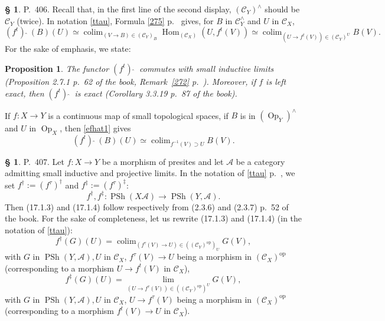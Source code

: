 \documentclass[12pt]{article}
\newtheorem{prop}[thm]{Proposition}
\theoremstyle{remark}
\theoremstyle{definition}
\newtheorem{s}[thm]{\S}
\newcommand{\oo}{\operatorname}
\newcommand{\A}{\mathcal A}
\newcommand{\C}{\mathcal C}
\newcommand{\fthat}{(f^t)\ \widehat{}\ }
\DeclareMathOperator*{\colim}{colim}
\DeclareMathOperator{\Hom}{Hom}
\DeclareMathOperator{\op}{op}
\DeclareMathOperator{\PSh}{PSh}
\begin{document}
\begin{s}\label{fhat}
P.~406. Recall that, in the first line of the second display, $(\C_Y)^\wedge$ should be $\C_Y$ (twice). In notation \eqref{ttau}, Formula \eqref{275} p.~\pageref{275} gives, for $B$ in $\C_Y^\wedge$ and $U$ in $\C_X$, 
%
\begin{equation}\label{efhat1}
\fthat(B)(U)\simeq\colim_{(V\to B)\in(\C_Y)_B}\Hom_{(\C_X)}(U,f^t(V))\simeq\colim_{(U\to f^t(V))\in(\C_Y)^U}B(V).
\end{equation}
%
For the sake of emphasis, we state: 

\begin{prop}\label{p406}
The functor $\fthat$ commutes with small inductive limits (Proposition 2.7.1 p.~62 of the book, Remark~\ref{272} p.~\pageref{272}). Moreover, if $f$ is left exact, then $\fthat$ is exact (Corollary 3.3.19 p.~87 of the book).
\end{prop}

If $f:X\to Y$ is a continuous map of small topological spaces, if $B$ is in $(\oo{Op}_Y)^\wedge$ and $U$ in $\oo{Op}_X$, then \eqref{efhat1} gives 
%
\begin{equation}\label{efhat2}
\fthat(B)(U)\simeq\colim_{f^{-1}(V)\supset U}B(V).
\end{equation}
%
\end{s}

%

\begin{s}\label{fdagger} 
P.~407. Let $f:X\to Y$ be a morphism of presites and let $\A$ be a category admitting small inductive and projective limits. In the notation of \eqref{ttau} p.~\pageref{ttau}, we set $f^\dagger:=(f^\tau)^\dagger$ and $f^\ddagger:=(f^\tau)^\ddagger$: 
$$
f^\dagger,f^\ddagger:\PSh(X\A)\to\PSh(Y,\A).
$$
Then (17.1.3) and (17.1.4) follow respectively from (2.3.6) and (2.3.7) p.~52 of the book. For the sake of completeness, let us rewrite (17.1.3) and (17.1.4) (in the notation of \eqref{ttau}):
%
\begin{equation}\label{1713}
f^\dagger(G)(U)=\colim_{(f^\tau(V)\to U)\in((\C_Y)^{\op})_U}G(V),
\end{equation}
%
with $G$ in $\PSh(Y,\A),U$ in $\C_X$, $f^\tau(V)\to U$ being a morphism in $(\C_X)^{\op}$ (corresponding to a morphism $U\to f^t(V)$ in $\C_X$), 
%
\begin{equation}\label{1714}
f^\ddagger(G)(U)=\lim_{(U\to f^\tau(V))\in((\C_Y)^{\op})^U}G(V),
\end{equation}
%
with $G$ in $\PSh(Y,\A),U$ in $\C_X$, $U\to f^\tau(V)$ being a morphism in $(\C_X)^{\op}$ (corresponding to a morphism $f^t(V)\to U$ in $\C_X$).
\end{s}
\end{document}
